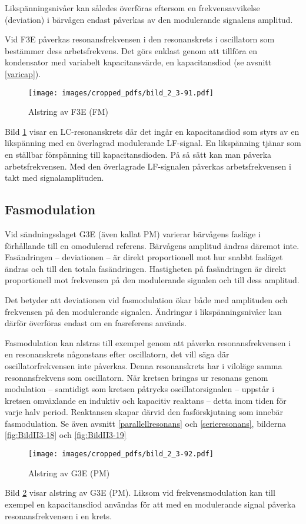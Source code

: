 Likspänningsnivåer kan således överföras eftersom en frekvensavvikelse
(deviation) i bärvågen endast påverkas av den modulerande signalens amplitud.

Vid F3E påverkas resonansfrekvensen i den resonanskrets i oscillatorn som
bestämmer dess arbetsfrekvens.
Det görs enklast genom att tillföra en kondensator med variabelt
kapacitansvärde, en kapacitansdiod (se avsnitt \ref{varicap}).

\begin{figure}
\texttt{[image: images/cropped\_pdfs/bild\_2\_3-91.pdf]}
\caption{Alstring av F3E (FM)}
\label{fig:BildII3-91}
\end{figure}

Bild \ref{fig:BildII3-91} visar en LC-resonanskrets där det ingår en
kapacitansdiod som styrs av en likspänning med en överlagrad modulerande LF-signal.
En likspänning tjänar som en ställbar förspänning till kapacitansdioden.
På så sätt kan man påverka arbetsfrekvensen.
Med den överlagrade LF-signalen påverkas arbetsfrekvensen i takt med
signalamplituden.

\subsection{Fasmodulation}

Vid sändningsslaget G3E (även kallat PM) varierar bärvågens fasläge i
förhållande till en omodulerad referens.
Bärvågens amplitud ändras däremot inte.
Fasändringen -- deviationen -- är direkt proportionell mot hur snabbt fasläget
ändras och till den totala fasändringen.
Hastigheten på fasändringen är direkt proportionell mot frekvensen på den
modulerande signalen och till dess amplitud.

Det betyder att deviationen vid fasmodulation ökar både med amplituden
och frekvensen på den modulerande signalen.
Ändringar i likspänningsnivåer kan därför överföras endast om en fasreferens
används.

Fasmodulation kan alstras till exempel genom att påverka resonansfrekvensen i
en resonanskrets någonstans efter oscillatorn, det vill säga där
oscillatorfrekvensen inte påverkas.
Denna resonanskrets har i viloläge samma resonansfrekvens som oscillatorn.
När kretsen bringas ur resonans genom modulation -- samtidigt som kretsen
påtrycks oscillatorsignalen -- uppstår i kretsen omväxlande en induktiv och
kapacitiv reaktans -- detta inom tiden för varje halv period.
Reaktansen skapar därvid den fasförskjutning som innebär fasmodulation.
Se även avsnitt \ref{parallellresonans} och \ref{serieresonans}, bilderna
\ref{fig:BildII3-18} och \ref{fig:BildII3-19}

\begin{figure}
\texttt{[image: images/cropped\_pdfs/bild\_2\_3-92.pdf]}
\caption{Alstring av G3E (PM)}
\label{fig:BildII3-92}
\end{figure}

Bild \ref{fig:BildII3-92} visar alstring av G3E (PM).
Liksom vid frekvensmodulation kan till exempel en kapacitansdiod användas för att
med en modulerande signal påverka resonansfrekvensen i en krets.
